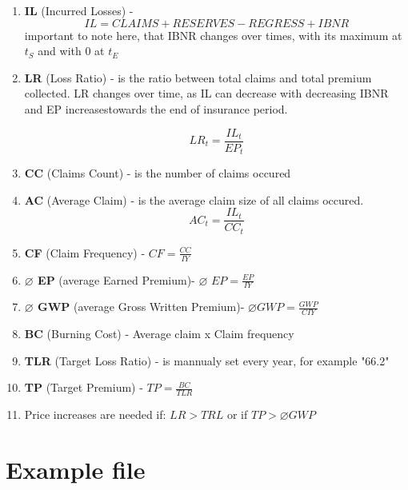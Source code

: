 \documentclass[11pt,a4paper,fleqn]{article}      %
\begin{document}
\begin{enumerate}
\item \textbf{IL} (Incurred Losses) - 
$$IL=CLAIMS + RESERVES - REGRESS + IBNR$$ important to note here, that IBNR changes over times, with its maximum at $t_{S}$ and with 0 at $t_{E}$

\item \textbf{LR} (Loss Ratio) -  is the ratio between total claims and total premium collected. LR changes over time, as IL can decrease with decreasing IBNR and EP increasestowards the end of insurance period. 

$$LR_t=\frac{IL_t}{EP_t}$$

\item \textbf{CC} (Claims Count) - is the number of claims occured

\item \textbf{AC} (Average Claim) - is the average claim size of all claims occured.
$$AC_t=\frac{IL_t}{CC_t}$$



\item \textbf{CF} (Claim Frequency) - $CF=\frac{CC}{IY}$

\item \textbf{$\varnothing$ EP} (average Earned Premium)- $\varnothing$ $EP =\frac{EP}{IY}$

\item \textbf{$\varnothing$ GWP} (average Gross Written Premium)- $\varnothing GWP =\frac{GWP}{CIY}$

\item \textbf{BC} (Burning Cost) - Average claim x Claim frequency

\item \textbf{TLR} (Target Loss Ratio) - is mannualy set every year, for example "66.2"

\item \textbf{TP} (Target Premium) - $TP=\frac{BC}{TLR}$

\item Price increases are needed if: $LR> TRL$ or if $TP>\varnothing GWP$



\end{enumerate}


\section{Example file}
\end{document}
